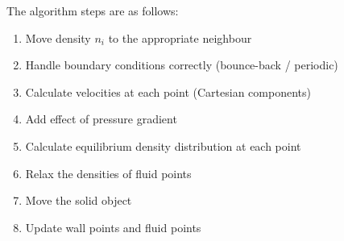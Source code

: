 The algorithm steps are as follows:
\begin{multicols}{2}
\begin{enumerate}
    \item Move density $n_i$ to the appropriate neighbour
    \item Handle boundary conditions correctly (bounce-back / periodic)
    \item Calculate velocities at each point (Cartesian components)
    \item Add effect of pressure gradient
    \item Calculate equilibrium density distribution at each point
    \item Relax the densities of fluid points
    \item Move the solid object
    \item Update wall points and fluid points
\end{enumerate}
\end{multicols}
